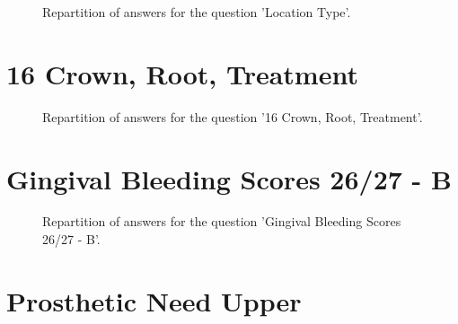 \documentclass[12pt]{article}
\begin{document}
\label{sec:15}


\begin{figure}[h!]
    \caption{\label{figure:q15-1}Repartition of answers for the question 'Location Type'.}
\end{figure}



\clearpage{}
\section{16
Crown, Root, Treatment}

\label{sec:27}


\begin{figure}[h!]
    \caption{\label{figure:q27-1}Repartition of answers for the question '16
Crown, Root, Treatment'.}
\end{figure}



\clearpage{}
\section{Gingival Bleeding Scores
26/27 - B}

\label{sec:60}


\begin{figure}[h!]
    \caption{\label{figure:q60-1}Repartition of answers for the question 'Gingival Bleeding Scores
26/27 - B'.}
\end{figure}



\clearpage{}
\section{Prosthetic Need
Upper}

\label{sec:71}
\end{document}
